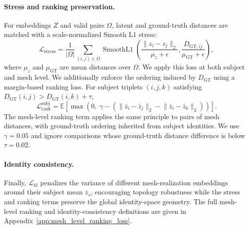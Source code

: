 \documentclass[10pt,twocolumn,letterpaper]{article}
\begin{document}
\paragraph{Stress and ranking preservation.}
For embeddings $Z$ and valid pairs $\Omega$, latent and ground-truth distances
are matched with a scale-normalized Smooth L1 stress:
\begin{equation}
\mathcal L_{\mathrm{stress}}
=
\frac{1}{|\Omega|}
\sum_{(i,j)\in\Omega}
\operatorname{SmoothL1}
\left(
\frac{\lVert z_i-z_j\rVert_2}{\mu_z+\epsilon},
\frac{D_{\mathrm{GT},ij}}{\mu_{\mathrm{GT}}+\epsilon}
\right),
\end{equation}
where $\mu_z$ and $\mu_{\mathrm{GT}}$ are mean distances over $\Omega$. We apply
this loss at both subject and mesh level. We additionally enforce the ordering
induced by $D_{\mathrm{GT}}$ using a margin-based ranking loss. For subject
triplets $(i,j,k)$ satisfying
$D_{\mathrm{GT}}(i,j)>D_{\mathrm{GT}}(i,k)+\tau$,
\begin{equation}
\mathcal L^{\mathrm{subj}}_{\mathrm{rank}}
=
\mathbb E
\left[
\max
\left(
0,\;
\gamma -
\left(
\lVert \bar z_i-\bar z_j\rVert_2
-
\lVert \bar z_i-\bar z_k\rVert_2
\right)
\right)
\right].
\end{equation}
The mesh-level ranking term applies the same principle to pairs of mesh
distances, with ground-truth ordering inherited from subject identities. We use
$\gamma=0.05$ and ignore comparisons whose ground-truth distance difference is
below $\tau=0.02$.

\paragraph{Identity consistency.}
Finally, $\mathcal L_{\mathrm{id}}$ penalizes the variance of different
mesh-realization embeddings around their subject mean $\bar z_s$, encouraging
topology robustness while the stress and ranking terms preserve the global
identity-space geometry. The full mesh-level ranking and identity-consistency
definitions are given in Appendix~\ref{app:mesh_level_ranking_loss}.
\end{document}
